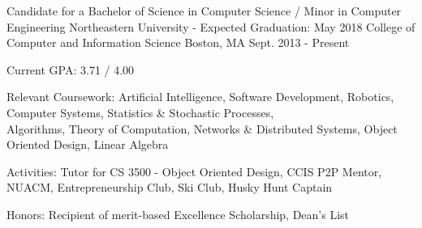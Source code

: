 


\begin{cventries}

  \cventry
    {Candidate for a Bachelor of Science in Computer Science / Minor in Computer Engineering} %
    {Northeastern University - Expected Graduation: May 2018 \newline College of Computer and Information Science} %
    {Boston, MA} %
    {Sept. 2013 - Present} %
    {
      \begin{cvitems} %
        \item {Current GPA: 3.71 / 4.00}
        \item {Relevant Coursework: Artificial Intelligence, Software Development, Robotics, Computer Systems, Statistics \& Stochastic Processes,\\
            \hspace*{3.11cm} Algorithms, Theory of Computation, Networks \& Distributed Systems, Object Oriented Design, Linear Algebra}
        \item {Activities: Tutor for CS 3500 - Object Oriented Design, CCIS P2P Mentor, NUACM, Entrepreneurship Club, Ski Club, Husky Hunt Captain}
        \item {Honors: Recipient of merit-based Excellence Scholarship, Dean's List}
      \end{cvitems}
    }

\end{cventries}
